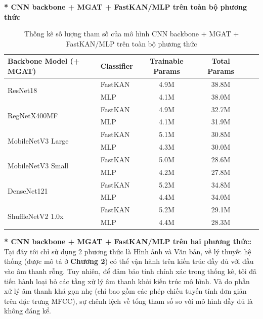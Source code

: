 \newpage
\textbf{* CNN backbone + MGAT + FastKAN/MLP trên toàn bộ phương thức}
\begin{table}[H]
    \centering
    \renewcommand{\arraystretch}{1.2}
    \setlength{\tabcolsep}{6pt}
    \caption{\centering Thống kê số lượng tham số của mô hình CNN backbone + MGAT + FastKAN/MLP trên toàn bộ phương thức}
    \begin{tabular}{llcccc}
        \hline
        \textbf{Backbone Model (+ MGAT)} & \textbf{Classifier} & \textbf{Trainable Params} & \textbf{Total Params} \\
        \hline
        \multirow{2}{*}{ResNet18} 
        & FastKAN & 4.9M & 38.8M \\
        & MLP & 4.1M & 38.0M \\
        \hline
        \multirow{2}{*}{RegNetX400MF} 
        & FastKAN & 4.9M & 32.7M \\
        & MLP & 4.1M & 31.9M \\
        \hline
        \multirow{2}{*}{MobileNetV3 Large} 
        & FastKAN & 5.1M & 30.8M \\
        & MLP & 4.3M & 30.0M \\
        \hline
        \multirow{2}{*}{MobileNetV3 Small} 
        & FastKAN & 5.0M & 28.6M \\
        & MLP & 4.2M & 27.8M \\
        \hline
        \multirow{2}{*}{DenseNet121} 
        & FastKAN & 5.2M & 34.8M \\
        & MLP & 4.4M & 34.0M \\
        \hline
        \multirow{2}{*}{ShuffleNetV2 1.0x} 
        & FastKAN & 5.2M & 29.1M \\
        & MLP & 4.4M & 28.3M \\
        \hline
    \end{tabular}
    \label{tab:PipelineFullParams}
\end{table}

\textbf{* CNN backbone + MGAT + FastKAN/MLP trên hai phương thức:} Tại đây tôi chỉ sử dụng 2 phương thức là Hình ảnh và Văn bản, về lý thuyết hệ thống (được mô tả ở \textbf{Chương 2}) có thể vận hành trên kiến trúc đầy đủ với đầu vào âm thanh rỗng. Tuy nhiên, để đảm bảo tính chính xác trong thống kê, tôi đã tiến hành loại bỏ các tầng xử lý âm thanh khỏi kiến trúc mô hình. Và do phần xử lý âm thanh khá gọn nhẹ (chỉ bao gồm các phép chiếu tuyến tính đơn giản trên đặc trưng MFCC), sự chênh lệch về tổng tham số so với mô hình đầy đủ là không đáng kể.\vspace{0.3cm}

